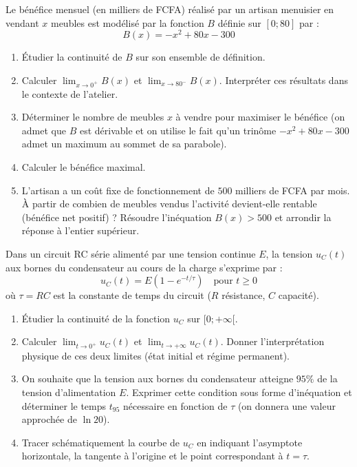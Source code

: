 \documentclass[11pt]{article}
\begin{document}
\begin{exercice}
Le bénéfice mensuel (en milliers de FCFA) réalisé par un artisan menuisier en vendant $x$ meubles est modélisé par la fonction $B$ définie sur $[0 ; 80]$ par :
\[ B(x) = -x^2 + 80x - 300 \]
\begin{enumerate}
\item Étudier la continuité de $B$ sur son ensemble de définition.
\item Calculer $\lim_{x\to 0^+} B(x)$ et $\lim_{x\to 80^-} B(x)$. Interpréter ces résultats dans le contexte de l'atelier.
\item Déterminer le nombre de meubles $x$ à vendre pour maximiser le bénéfice (on admet que $B$ est dérivable et on utilise le fait qu'un trinôme $-x^2+80x-300$ admet un maximum au sommet de sa parabole).
\item Calculer le bénéfice maximal.
\item L'artisan a un coût fixe de fonctionnement de $500$ milliers de FCFA par mois. À partir de combien de meubles vendus l'activité devient-elle rentable (bénéfice net positif) ? Résoudre l'inéquation $B(x) > 500$ et arrondir la réponse à l'entier supérieur.
\end{enumerate}
\end{exercice}

\begin{exercice}
Dans un circuit RC série alimenté par une tension continue $E$, la tension $u_C(t)$ aux bornes du condensateur au cours de la charge s'exprime par :
\[ u_C(t) = E \left( 1 - e^{-t/\tau} \right) \quad \text{pour } t \ge 0 \]
où $\tau = RC$ est la constante de temps du circuit ($R$ résistance, $C$ capacité).
\begin{enumerate}
\item Étudier la continuité de la fonction $u_C$ sur $[0 ; +\infty[$.
\item Calculer $\lim_{t\to 0^+} u_C(t)$ et $\lim_{t\to +\infty} u_C(t)$. Donner l'interprétation physique de ces deux limites (état initial et régime permanent).
\item On souhaite que la tension aux bornes du condensateur atteigne $95\%$ de la tension d'alimentation $E$. Exprimer cette condition sous forme d'inéquation et déterminer le temps $t_{95}$ nécessaire en fonction de $\tau$ (on donnera une valeur approchée de $\ln 20$).
\item Tracer schématiquement la courbe de $u_C$ en indiquant l'asymptote horizontale, la tangente à l'origine et le point correspondant à $t = \tau$.
\end{enumerate}
\end{exercice}
\end{document}
